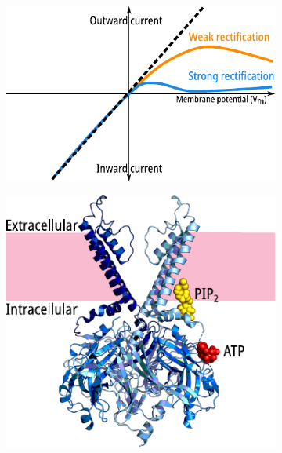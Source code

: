 \begin{figure}[hbtp]
	\centering
	\begin{subfigure}[t]{0.5\textwidth}
		\caption{}\label{ch1fig:rectification}
		\centering
		\includegraphics[width=\textwidth]{rectification.pdf}
	\end{subfigure}
	\hfill
	\begin{subfigure}[t]{0.4\textwidth}
		\caption{}\label{ch1fig:kir_struct}
		\centering
		\includegraphics[width=\textwidth]{kir_structure.pdf}
	\end{subfigure}
	\vfill
	\begin{subfigure}[t]{0.6\textwidth}

\end{subfigure}
\end{figure}
